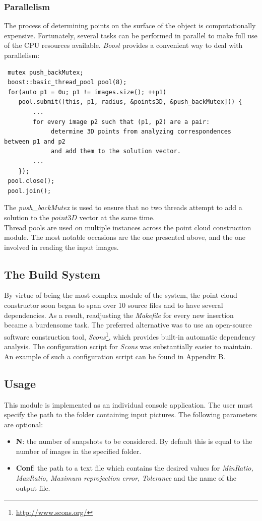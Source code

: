 \documentclass[12pt,a4paper,twoside,openright]{report}
\begin{document}
\subsubsection{Parallelism}
The process of determining points on the surface of the object is computationally expensive. Fortunately, several tasks can be performed in parallel to make full use of the CPU resources available. \emph{Boost} provides a convenient way to deal with parallelism: \\
\begin{verbatim}
 mutex push_backMutex;
 boost::basic_thread_pool pool(8);
 for(auto p1 = 0u; p1 != images.size(); ++p1)
    pool.submit([this, p1, radius, &points3D, &push_backMutex]() {
    	...
    	for every image p2 such that (p1, p2) are a pair:
    		 determine 3D points from analyzing correspondences between p1 and p2
    		 and add them to the solution vector.
    	...
    });
 pool.close();
 pool.join();
\end{verbatim}
The \emph{push\_backMutex} is used to ensure that no two threads attempt to add a solution to the $point3D$ vector at the same time.\\
Thread pools are used on multiple instances across the point cloud construction module. The most notable occasions are the one presented above, and the one involved in reading the input images.

\subsection{The Build System}
By virtue of being the most complex module of the system, the point cloud constructor soon began to span over 10 source files and to have several dependencies. As a result, readjusting the \emph{Makefile} for every new insertion became a burdensome task. The preferred alternative was to use an open-source software construction tool, \emph{Scons}\footnote{\url{http://www.scons.org/}}, which provides built-in automatic dependency analysis. The configuration script for \emph{Scons} was substantially easier to maintain. An example of such a configuration script can be found in Appendix B.

\subsection{Usage}
This module is implemented as an individual console application. The user must specify the path to the folder containing input pictures. The following parameters are optional:
\begin{itemize}
\item \textbf{N}: the number of snapshots to be considered. By default this is equal to the number of images in the specified folder. 
\item \textbf{Conf}: the path to a text file which contains the desired values for \emph{MinRatio, MaxRatio, Maximum reprojection error}, \emph{Tolerance} and the name of the output file.
\end{itemize}
\end{document}
